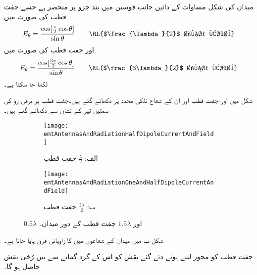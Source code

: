 میدان کی شکل مساوات  کے دائیں جانب قوسین میں بند جزو پر منحصر ہے جسے  جفت قطب کی صورت میں
\begin{align}\label{مساوات_اینٹینا_نصف_طول_موج_اینٹینا}
E_{\theta} =\frac{\cos [\frac{\pi}{2} \cos \theta]}{\sin \theta} \quad \quad \text{\RL{$\frac{\lambda}{2}$ جفت قطب}}
\end{align}
اور  جفت قطب کی صورت میں
\begin{align}
E_{\theta} =\frac{\cos [\frac{3\pi}{2} \cos \theta]}{\sin \theta} \quad \quad \text{\RL{$\frac{3\lambda}{2}$ جفت قطب}}
\end{align}
لکھا جا سکتا ہے۔

شکل  میں  اور  جفت قطب اور ان کے شعاع نلکی محدد پر دکھائے گئے ہیں۔جفت قطب پر برقی رو کی سمتیں تیر کے نشان سے دکھائے گئے ہیں۔

\begin{figure}
\centering
\begin{subfigure}{0.5\textwidth}
\centering
\texttt{[image: emtAntennasAndRadiationHalfDipoleCurrentAndField]}
\caption*{الف: $\frac{\lambda}{2}$ جفت قطب}
\end{subfigure}%
%
\begin{subfigure}{0.5\textwidth}
\centering
\texttt{[image: emtAntennasAndRadiationOneAndHalfDipoleCurrentAndField]}
\caption*{ب: $\frac{3\lambda}{2}$ جفت قطب}
\end{subfigure}%
\caption{$0.5\lambda$ اور $1.5\lambda$ جفت قطب کے دور میدان۔}
\label{شکل_اینٹینا_نصف_جفت_قطب_برقی_رو}
\end{figure}%

شکل-ب میں میدان کے شعاعوں میں  کا زاویائی فرق پایا جاتا ہے۔

جفت قطب کو محور لیتے ہوئے دئے گئے نقش کو اس کے گرد گمانے سے تین رُخی نقش حاصل ہو گا۔ 

